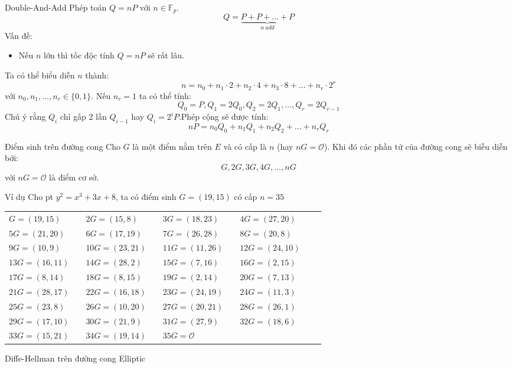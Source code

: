 \documentclass[compress]{beamer}
\begin{document}
\begin{frame}{Double-And-Add}
Phép toán $Q = nP$ với $n \in \mathbb{F}_p$.
\begin{displaymath}
Q = \underbrace{P + P + \ldots + P}_{n \ add}
\end{displaymath}
Vấn đề:
\begin{itemize}
\item Nếu $n$ lớn thì tốc độc tính $Q = nP$ sẽ rất lâu.
\end{itemize}
Ta có thể biểu diễn $n$ thành:
\begin{displaymath}
n = n_0 + n_1 \cdot 2 + n_2 \cdot 4 + n_3 \cdot 8 + \ldots + n_r \cdot 2^r 
\end{displaymath}
với $n_0, n_1, \ldots, n_r \in \{0,1\}$. Nếu $n_r = 1$ ta có thể tính:
\begin{displaymath}
Q_0 = P, Q_1 = 2Q_0, Q_2 = 2Q_1, \ldots, Q_r = 2Q_{r-1}
\end{displaymath}
Chú ý rằng $Q_i$ chỉ gấp 2 lần $Q_{i - 1}$ hay $Q_i = 2^iP$.Phép cộng sẽ được tính:
\begin{displaymath}
nP = n_0Q_0 + n_1Q_1 + n_2Q_2 + \ldots + n_rQ_r
\end{displaymath}
\end{frame}
\begin{frame}{Điểm sinh trên đường cong}
Cho $G$ là một điểm nằm trên $E$ và có cấp là $n$ (hay $nG = \mathcal{O}$). Khi đó các phần tử của đường cong sẽ biễu diễn bởi:
\begin{displaymath}
G, 2G, 3G, 4G, \ldots, nG
\end{displaymath}
với $nG = \mathcal{O}$ là điểm cơ sở.
\end{frame}
\begin{frame}{Ví dụ}
Cho pt $y^2 = x^3 + 3x + 8$, ta có điểm sinh $G = (19, 15)$ có cấp $n = 35$
\small{
\begin{center}
\begin{tabular}{lllllllll}
$G = (19, 15)$ & & $2G = (15, 8)$ & & $3G = (18, 23)$ & & $4G = (27, 20)$ \\
$5G = (21, 20)$ & & $6G = (17, 19)$ & & $7G = (26, 28)$ & & $8G = (20, 8)$ \\
$9G = (10, 9)$ & & $10G = (23, 21)$ & & $11G = (11, 26)$ & & $12G = (24, 10)$ \\
$13G = (16, 11)$ & & $14G = (28, 2)$ & & $15G = (7, 16)$ & & $16G = (2, 15)$ \\
$17G = (8, 14)$ & & $18G = (8, 15)$ & & $19G = (2, 14)$ & & $20G = (7, 13)$ \\
$21G = (28, 17)$ & & $22G = (16, 18)$ & & $23G = (24, 19)$ & & $24G = (11, 3)$ \\
$25G = (23, 8)$ & & $26G = (10, 20)$ & & $27G = (20, 21)$ & & $28G = (26, 1)$ \\
$29G = (17, 10)$ & & $30G = (21, 9)$ & & $31G = (27, 9)$ & & $32G = (18, 6)$ \\
$33G = (15, 21)$ & & $34G = (19, 14)$ & &$35G = \mathcal{O}$ \\
\end{tabular}
\end{center}
}
\end{frame}
\begin{frame}{Diffe-Hellman trên đường cong Elliptic}

\end{frame}
\end{document}
